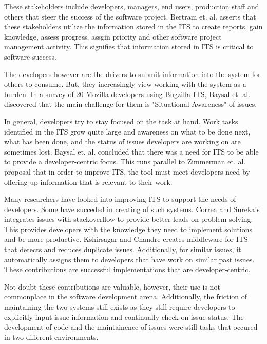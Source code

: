 \documentclass{mproj}
\begin{document}
These stakeholders include developers, managers, end users, production staff and others that steer the success of the software project. Bertram et. al. asserts that these stakeholders utilize the information stored in the ITS to create reports, gain knowledge, assess progress, assgin priority and other software project management activity. This signifies that information stored in ITS is critical to software success.

The developers however are the drivers to submit information into the system for others to consume. But, they increasingly view working with the system as a burden. In a survey of 20 Mozilla developers using Bugzilla ITS, Baysal et. al. \cite{Baysal:2013} discovered that the main challenge for them is "Situational Awareness" of issues.

In general, developers try to stay focused on the task at hand. Work tasks identified in the ITS grow quite large and awareness on what to be done next, what has been done, and the status of issues developers are working on are sometimes lost. Baysal et. al. \cite{Baysal:2013} concluded that there was a need for ITS to be able to provide a developer-centric focus. This runs parallel to Zimmerman et. al. \cite{Zimmermann:2009} proposal that in order to improve ITS, the tool must meet developers need by offering up information that is relevant to their work.

Many researchers have looked into improving ITS to support the needs of developers. Some have succeded in creating of such systems. Correa and Sureka's \cite{Correa:2013} integrates issues with stackoverflow to provide better leads on problem solving. This provides developers with the knowledge they need to implement solutions and be more productive. Kshirsagar and Chandre \cite{Kshirsagar:2015} creates middleware for ITS that detects and reduces duplicate issues. Additionally, for similar issues, it automatically assigns them to developers that have work on similar past issues. These contributions are successful implementations that are developer-centric.

Not doubt these contributions are valuable, however, their use is not commonplace in the software development arena. Additionally, the friction of maintaining the two systems still exists as they still require developers to explicitly input issue information and continually check on issue status. The development of code and the maintainence of issues were still tasks that occured in two different environments. 
\end{document}
